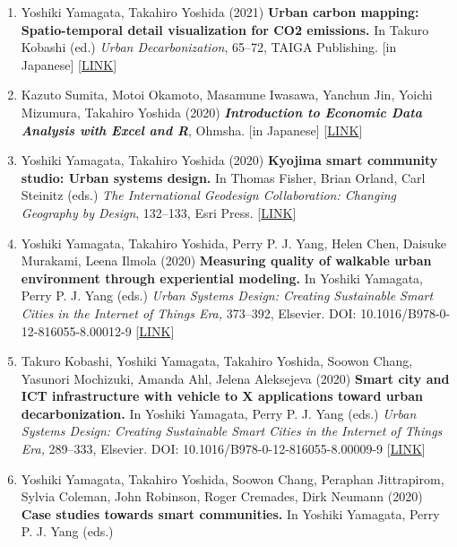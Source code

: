 \documentclass[
]{book}
\providecommand{\tightlist}{%
  \setlength{\itemsep}{0pt}\setlength{\parskip}{0pt}}
\begin{document}
\begin{enumerate}
\def\labelenumi{\arabic{enumi}.}
\tightlist
\item
  Yoshiki Yamagata, Takahiro Yoshida (2021)
  \textbf{Urban carbon mapping: Spatio-temporal detail visualization for CO2 emissions.}
  In Takuro Kobashi (ed.)
  \emph{Urban Decarbonization}, 65--72, TAIGA Publishing.
  {[}in Japanese{]} {[}\href{https://www.taigashuppan.co.jp/products/detail/552}{LINK}{]}
\item
  Kazuto Sumita, Motoi Okamoto, Masamune Iwasawa, Yanchun Jin, Yoichi Mizumura, Takahiro Yoshida (2020)
  \textbf{\emph{Introduction to Economic Data Analysis with Excel and R}}, Ohmsha.
  {[}in Japanese{]} {[}\href{https://www.ohmsha.co.jp/book/9784274225628/}{LINK}{]}
\item
  Yoshiki Yamagata, Takahiro Yoshida (2020)
  \textbf{Kyojima smart community studio: Urban systems design.}
  In Thomas Fisher, Brian Orland, Carl Steinitz (eds.)
  \emph{The International Geodesign Collaboration: Changing Geography by Design}, 132--133, Esri Press.
  {[}\href{https://esripress.esri.com/display/index.cfm?fuseaction=display\&websiteID=388\&moduleID=0}{LINK}{]}
\item
  Yoshiki Yamagata, Takahiro Yoshida, Perry P. J. Yang, Helen Chen, Daisuke Murakami, Leena Ilmola (2020)
  \textbf{Measuring quality of walkable urban environment through experiential modeling.}
  In Yoshiki Yamagata, Perry P. J. Yang (eds.)
  \emph{Urban Systems Design: Creating Sustainable Smart Cities in the Internet of Things Era,} 373--392, Elsevier.
  DOI: 10.1016/B978-0-12-816055-8.00012-9 {[}\href{https://www.elsevier.com/books/urban-systems-design/yamagata/978-0-12-816055-8}{LINK}{]}
\item
  Takuro Kobashi, Yoshiki Yamagata, Takahiro Yoshida, Soowon Chang, Yasunori Mochizuki, Amanda Ahl, Jelena Aleksejeva (2020)
  \textbf{Smart city and ICT infrastructure with vehicle to X applications toward urban decarbonization.}
  In Yoshiki Yamagata, Perry P. J. Yang (eds.)
  \emph{Urban Systems Design: Creating Sustainable Smart Cities in the Internet of Things Era,} 289--333, Elsevier.
  DOI: 10.1016/B978-0-12-816055-8.00009-9 {[}\href{https://www.elsevier.com/books/urban-systems-design/yamagata/978-0-12-816055-8}{LINK}{]}
\item
  Yoshiki Yamagata, Takahiro Yoshida, Soowon Chang, Peraphan Jittrapirom, Sylvia Coleman, John Robinson, Roger Cremades, Dirk Neumann (2020)
  \textbf{Case studies towards smart communities.}
  In Yoshiki Yamagata, Perry P. J. Yang (eds.)

\end{enumerate}
\end{document}
